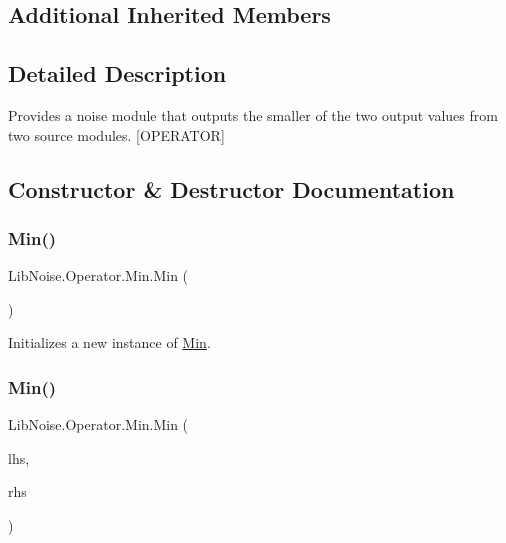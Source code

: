 \subsection*{Additional Inherited Members}


\subsection{Detailed Description}
Provides a noise module that outputs the smaller of the two output values from two source modules. \mbox{[}O\+P\+E\+R\+A\+T\+OR\mbox{]} 



\subsection{Constructor \& Destructor Documentation}
\mbox{\label{class_lib_noise_1_1_operator_1_1_min_a9683967df18c7c820b31389698c4090d}} 
\subsubsection{\texorpdfstring{Min()}{Min()}\hspace{0.1cm}{\footnotesize\ttfamily [1/2]}}
{\footnotesize\ttfamily Lib\+Noise.\+Operator.\+Min.\+Min (\begin{DoxyParamCaption}{ }\end{DoxyParamCaption})}



Initializes a new instance of \hyperlink{class_lib_noise_1_1_operator_1_1_min}{Min}. 

\mbox{\label{class_lib_noise_1_1_operator_1_1_min_a5b268244f99e10a2a15623b274d1135e}} 
\subsubsection{\texorpdfstring{Min()}{Min()}\hspace{0.1cm}{\footnotesize\ttfamily [2/2]}}
{\footnotesize\ttfamily Lib\+Noise.\+Operator.\+Min.\+Min (\begin{DoxyParamCaption}\item[{\hyperlink{class_lib_noise_1_1_module_base}{Module\+Base}}]{lhs,  }\item[{\hyperlink{class_lib_noise_1_1_module_base}{Module\+Base}}]{rhs }\end{DoxyParamCaption})}



